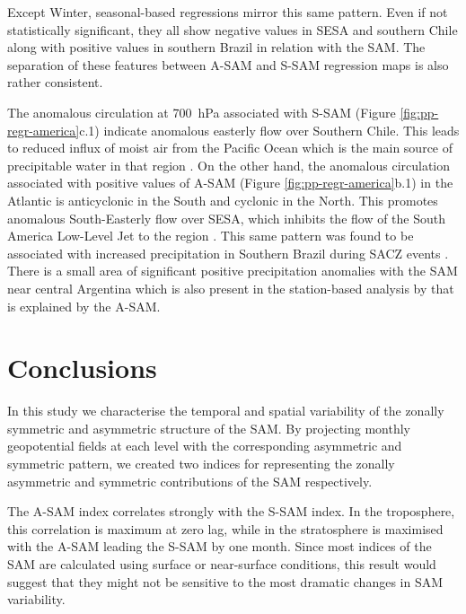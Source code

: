 \documentclass[smallextended]{svjour3}       %
\begin{document}
Except Winter, seasonal-based regressions mirror this same pattern.
Even if not statistically significant, they all show negative values in SESA and southern Chile along with positive values in southern Brazil in relation with the SAM.
The separation of these features between A\nobreakdash-SAM and S\nobreakdash-SAM regression maps is also rather consistent.

The anomalous circulation at 700~hPa associated with S\nobreakdash-SAM (Figure \ref{fig:pp-regr-america}c.1) indicate anomalous easterly flow over Southern Chile. This leads to reduced influx of moist air from the Pacific Ocean which is the main source of precipitable water in that region \citep[e.g.][]{garreaud2007}. On the other hand, the anomalous circulation associated with positive values of A\nobreakdash-SAM (Figure \ref{fig:pp-regr-america}b.1) in the Atlantic is anticyclonic in the South and cyclonic in the North. This promotes anomalous South-Easterly flow over SESA, which inhibits the flow of the South America Low-Level Jet to the region \citep{silvestri2009, zamboni2010}. This same pattern was found to be associated with increased precipitation in Southern Brazil during SACZ events \citep{rosso2018}.
There is a small area of significant positive precipitation anomalies with the SAM near central Argentina which is also present in the station-based analysis by \citet{gillett2006} that is explained by the A\nobreakdash-SAM.

\hypertarget{conclusions}{%
\section{Conclusions}\label{conclusions}}

In this study we characterise the temporal and spatial variability of the zonally symmetric and asymmetric structure of the SAM.
By projecting monthly geopotential fields at each level with the corresponding asymmetric and symmetric pattern, we created two indices for representing the zonally asymmetric and symmetric contributions of the SAM respectively.

The A\nobreakdash-SAM index correlates strongly with the S\nobreakdash-SAM index.
In the troposphere, this correlation is maximum at zero lag, while in the stratosphere is maximised with the A\nobreakdash-SAM leading the S\nobreakdash-SAM by one month.
Since most indices of the SAM are calculated using surface or near-surface conditions, this result would suggest that they might not be sensitive to the most dramatic changes in SAM variability.
\end{document}
